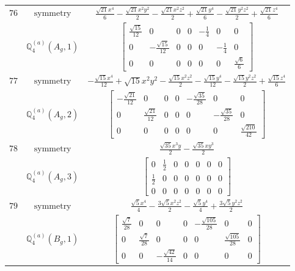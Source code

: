 \documentclass[fleqn,8pt,landscape]{jsarticle}
\begin{document}
\begin{longtable}{ccc}
$ 76 $ & $ \text{symmetry} $ & $ \frac{\sqrt{21} x^{4}}{6} - \frac{\sqrt{21} x^{2} y^{2}}{2} - \frac{\sqrt{21} x^{2} z^{2}}{2} + \frac{\sqrt{21} y^{4}}{6} - \frac{\sqrt{21} y^{2} z^{2}}{2} + \frac{\sqrt{21} z^{4}}{6} $ \\
$  $ & $ \mathbb{Q}_{4}^{(a)}(A_{g},1) $ & $ \begin{bmatrix} \frac{\sqrt{15}}{12} & 0 & 0 & 0 & - \frac{1}{4} & 0 & 0 \\ 0 & - \frac{\sqrt{15}}{12} & 0 & 0 & 0 & - \frac{1}{4} & 0 \\ 0 & 0 & 0 & 0 & 0 & 0 & \frac{\sqrt{6}}{6} \end{bmatrix} $ \\ \hline
$ 77 $ & $ \text{symmetry} $ & $ - \frac{\sqrt{15} x^{4}}{12} + \sqrt{15} x^{2} y^{2} - \frac{\sqrt{15} x^{2} z^{2}}{2} - \frac{\sqrt{15} y^{4}}{12} - \frac{\sqrt{15} y^{2} z^{2}}{2} + \frac{\sqrt{15} z^{4}}{6} $ \\
$  $ & $ \mathbb{Q}_{4}^{(a)}(A_{g},2) $ & $ \begin{bmatrix} - \frac{\sqrt{21}}{12} & 0 & 0 & 0 & - \frac{\sqrt{35}}{28} & 0 & 0 \\ 0 & \frac{\sqrt{21}}{12} & 0 & 0 & 0 & - \frac{\sqrt{35}}{28} & 0 \\ 0 & 0 & 0 & 0 & 0 & 0 & \frac{\sqrt{210}}{42} \end{bmatrix} $ \\ \hline
$ 78 $ & $ \text{symmetry} $ & $ \frac{\sqrt{35} x^{3} y}{2} - \frac{\sqrt{35} x y^{3}}{2} $ \\
$  $ & $ \mathbb{Q}_{4}^{(a)}(A_{g},3) $ & $ \begin{bmatrix} 0 & \frac{1}{2} & 0 & 0 & 0 & 0 & 0 \\ \frac{1}{2} & 0 & 0 & 0 & 0 & 0 & 0 \\ 0 & 0 & 0 & 0 & 0 & 0 & 0 \end{bmatrix} $ \\ \hline
$ 79 $ & $ \text{symmetry} $ & $ \frac{\sqrt{5} x^{4}}{4} - \frac{3 \sqrt{5} x^{2} z^{2}}{2} - \frac{\sqrt{5} y^{4}}{4} + \frac{3 \sqrt{5} y^{2} z^{2}}{2} $ \\
$  $ & $ \mathbb{Q}_{4}^{(a)}(B_{g},1) $ & $ \begin{bmatrix} \frac{\sqrt{7}}{28} & 0 & 0 & 0 & - \frac{\sqrt{105}}{28} & 0 & 0 \\ 0 & \frac{\sqrt{7}}{28} & 0 & 0 & 0 & \frac{\sqrt{105}}{28} & 0 \\ 0 & 0 & - \frac{\sqrt{42}}{14} & 0 & 0 & 0 & 0 \end{bmatrix} $ \\ \hline

\end{longtable}
\end{document}
